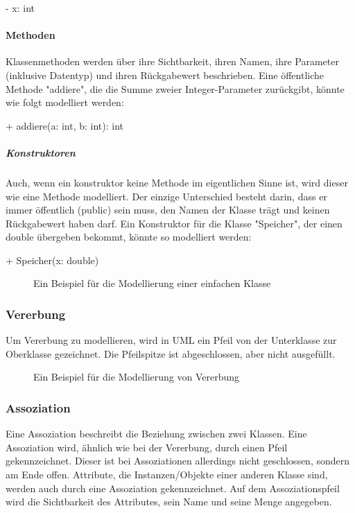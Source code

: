 \documentclass{article}
\begin{document}
	\begin{center}
		- x: int
	\end{center}

	\paragraph{Methoden}
	Klassenmethoden werden über ihre Sichtbarkeit, ihren Namen, ihre Parameter (inklusive Datentyp) und ihren Rückgabewert beschrieben. Eine öffentliche Methode "addiere", die die Summe zweier Integer-Parameter zurückgibt, könnte wie folgt modelliert werden:

	\begin{center}
		+ addiere(a: int, b: int): int
	\end{center}

	\subparagraph{Konstruktoren}
	Auch, wenn ein konstruktor keine Methode im eigentlichen Sinne ist, wird dieser wie eine Methode modelliert. Der einzige Unterschied besteht darin, dass er immer öffentlich (public) sein muss, den Namen der Klasse trägt und keinen Rückgabewert haben darf. Ein Konstruktor für die Klasse "Speicher", der einen double übergeben bekommt, könnte so modelliert werden:

	\begin{center}
		+ Speicher(x: double)
	\end{center}

	\begin{figure}[h!]
		\centering
		
		\caption{Ein Beispiel für die Modellierung einer einfachen Klasse}
	\end{figure}

	\subsubsection{Vererbung}
	Um Vererbung zu modellieren, wird in UML ein Pfeil von der Unterklasse zur Oberklasse gezeichnet. Die Pfeilspitze ist abgeschlossen, aber nicht ausgefüllt.

	\begin{figure}[h!]
		\centering
		
		\caption{Ein Beispiel für die Modellierung von Vererbung}
	\end{figure}

	\subsubsection{Assoziation}
	Eine Assoziation beschreibt die Beziehung zwischen zwei Klassen. Eine Assoziation wird, ähnlich wie bei der Vererbung, durch einen Pfeil gekennzeichnet. Dieser ist bei Assoziationen allerdings nicht geschlossen, sondern am Ende offen. Attribute, die Instanzen/Objekte einer anderen Klasse sind, werden auch durch eine Assoziation gekennzeichnet. Auf dem Assoziationspfeil wird die Sichtbarkeit des Attributes, sein Name und seine Menge angegeben.
\end{document}
